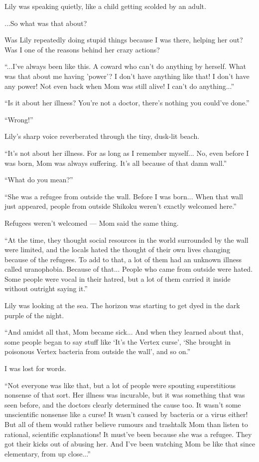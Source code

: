 Lily was speaking quietly, like a child getting scolded by an adult.

...So what was that about?

Was Lily repeatedly doing stupid things because I was there, helping her out? Was I one of the reasons behind her crazy actions?

``...I've always been like this. A coward who can't do anything by herself. What was that about me having 'power'? I don't have anything like that! I don't have any power! Not even back when Mom was still alive! I can't do anything...''

``Is it about her illness? You're not a doctor, there's nothing you could've done.''

``Wrong!''

Lily's sharp voice reverberated through the tiny, dusk-lit beach.

``It's not about her illness. For as long as I remember myself... No, even before I was born, Mom was always suffering. It's all because of that damn wall.''

``What do you mean?''

``She was a refugee from outside the wall. Before I was born... When that wall just appeared, people from outside Shikoku weren't exactly welcomed here.''

Refugees weren't welcomed --- Mom said the same thing.

``At the time, they thought social resources in the world surrounded by the wall were limited, and the locals hated the thought of their own lives changing because of the refugees. To add to that, a lot of them had an unknown illness called uranophobia. Because of that... People who came from outside were hated. Some people were vocal in their hatred, but a lot of them carried it inside without outright saying it.''

Lily was looking at the sea. The horizon was starting to get dyed in the dark purple of the night.

``And amidst all that, Mom became sick... And when they learned about that, some people began to say stuff like `It's the Vertex curse', `She brought in poisonous Vertex bacteria from outside the wall', and so on.''

I was lost for words.

``Not everyone was like that, but a lot of people were spouting superstitious nonsense of that sort. Her illness was incurable, but it was something that was seen before, and the doctors clearly determined the cause too. It wasn't some unscientific nonsense like a curse! It wasn't caused by bacteria or a virus either! But all of them would rather believe rumours and trashtalk Mom than listen to rational, scientific explanations! It must've been because she was a refugee. They got their kicks out of abusing her. And I've been watching Mom be like that since elementary, from up close...''


